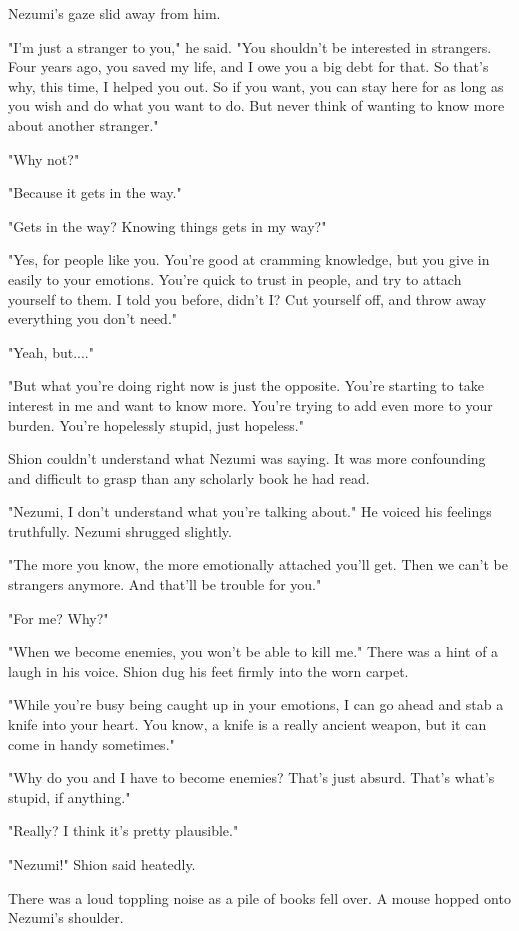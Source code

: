 Nezumi's gaze slid away from him.

"I'm just a stranger to you," he said. "You shouldn't be interested in
strangers. Four years ago, you saved my life, and I owe you a big debt
for that. So that's why, this time, I helped you out. So if you want,
you can stay here for as long as you wish and do what you want to do.
But never think of wanting to know more about another stranger."

"Why not?"

"Because it gets in the way."

"Gets in the way? Knowing things gets in my way?"

"Yes, for people like you. You're good at cramming knowledge, but you
give in easily to your emotions. You're quick to trust in people, and
try to attach yourself to them. I told you before, didn't I? Cut
yourself off, and throw away everything you don't need."

"Yeah, but...."

"But what you're doing right now is just the opposite. You're starting
to take interest in me and want to know more. You're trying to add even
more to your burden. You're hopelessly stupid, just hopeless."

Shion couldn't understand what Nezumi was saying. It was more
confounding and difficult to grasp than any scholarly book he had read.

"Nezumi, I don't understand what you're talking about." He voiced his
feelings truthfully. Nezumi shrugged slightly.

"The more you know, the more emotionally attached you'll get. Then we
can't be strangers anymore. And that'll be trouble for you."

"For me? Why?"

"When we become enemies, you won't be able to kill me." There was a hint
of a laugh in his voice. Shion dug his feet firmly into the worn carpet.

"While you're busy being caught up in your emotions, I can go ahead and
stab a knife into your heart. You know, a knife is a really ancient
weapon, but it can come in handy sometimes."

"Why do you and I have to become enemies? That's just absurd. That's
what's stupid, if anything."

"Really? I think it's pretty plausible."

"Nezumi!" Shion said heatedly.

There was a loud toppling noise as a pile of books fell over. A mouse
hopped onto Nezumi's shoulder.

